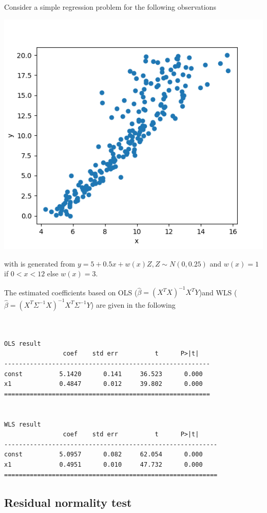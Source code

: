 \begin{refsection}
\begin{example}
Consider a simple regression problem for the following observations
\begin{center}
	\includegraphics[width=0.5\linewidth]{../figures/statisticalModeling/regressionAnalysis/WLSDemo}
\end{center}
with is generated from $y = 5 + 0.5x + w(x) Z, Z\sim N(0, 0.25)$ and $w(x) = 1$ if $0 < x < 12$ else $w(x) = 3$. 

The estimated coefficients based on OLS ($\hat{\beta} = (X^TX)^{-1}X^TY$)and WLS  ($\hat{\beta} = (X^T\Sigma^{-1} X)^{-1}X^T\Sigma^{-1}Y$) are given in the following

\begin{Verbatim}[fontsize=\small]


OLS result
				coef    std err          t      P>|t|      
--------------------------------------------------------
const          5.1420      0.141     36.523      0.000  
x1             0.4847      0.012     39.802      0.000  
========================================================


WLS result
				coef    std err          t      P>|t|      
----------------------------------------------------------
const          5.0957      0.082     62.054      0.000    
x1             0.4951      0.010     47.732      0.000    
==========================================================

\end{Verbatim}
	

	
	
	
	
\end{example}



\subsection{Residual normality test}


\end{refsection}
